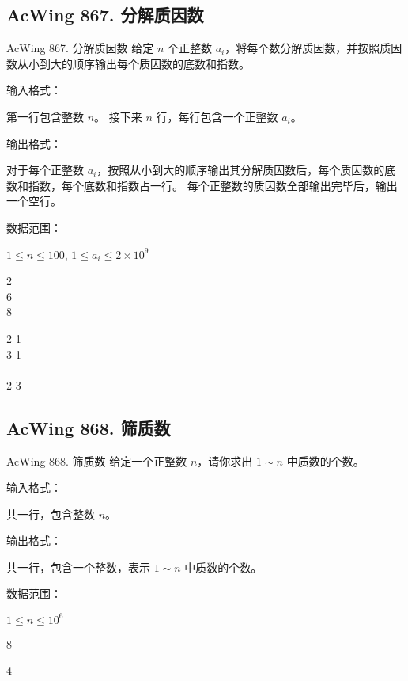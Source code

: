 \subsection{AcWing 867. 分解质因数}
\begin{titledbox}{AcWing 867. 分解质因数}
    给定 $n$ 个正整数 $a_i$，将每个数分解质因数，并按照质因数从小到大的顺序输出每个质因数的底数和指数。

    输入格式：

    第一行包含整数 $n$。 接下来 $n$ 行，每行包含一个正整数 $a_i$。

    输出格式：

    对于每个正整数 $a_i$，按照从小到大的顺序输出其分解质因数后，每个质因数的底数和指数，每个底数和指数占一行。 每个正整数的质因数全部输出完毕后，输出一个空行。

    数据范围：

    $1 \le n \le 100$, $1 \le a_i \le 2 \times 10^9$

    \begin{inputblock}
        2 \\
        6 \\
        8
    \end{inputblock}
    \begin{outputblock}
        2 1 \\
        3 1 \\
        \\
        2 3 \\

    \end{outputblock}
\end{titledbox}

\subsection{AcWing 868. 筛质数}
\begin{titledbox}{AcWing 868. 筛质数}
    给定一个正整数 $n$，请你求出 $1 \sim n$ 中质数的个数。

    输入格式：

    共一行，包含整数 $n$。

    输出格式：

    共一行，包含一个整数，表示 $1 \sim n$ 中质数的个数。

    数据范围：

    $1 \le n \le 10^6$

    \begin{inputblock}
        8
    \end{inputblock}
    \begin{outputblock}
        4
    \end{outputblock}
\end{titledbox}



